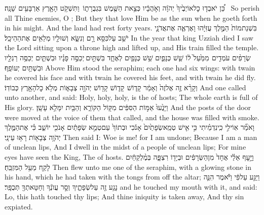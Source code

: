 {כֵּ֠ן יֹאבְד֤וּ כׇל\maqqaf אוֹיְבֶ֙יךָ֙ יְהֹוָ֔ה וְאֹ֣הֲבָ֔יו כְּצֵ֥את הַשֶּׁ֖מֶשׁ בִּגְבֻרָת֑וֹ \setuma  וַתִּשְׁקֹ֥ט הָאָ֖רֶץ אַרְבָּעִ֥ים שָׁנָֽה׃ \petucha }
{So perish all Thine enemies, O \lord; But they that love Him be as the sun when he goeth forth in his might. And the land had rest forty years.}
\newperek
{}
\label{haft_17}
\setcounter{chap}{6}
\setcounter{verse}{1}
{בִּשְׁנַת\maqqaf מוֹת֙ הַמֶּ֣לֶךְ עֻזִּיָּ֔הוּ וָאֶרְאֶ֧ה אֶת\maqqaf אֲדֹנָ֛י יֹשֵׁ֥ב עַל\maqqaf כִּסֵּ֖א רָ֣ם וְנִשָּׂ֑א וְשׁוּלָ֖יו מְלֵאִ֥ים אֶת\maqqaf הַהֵיכָֽל׃}
{In the year that king Uzziah died I saw the Lord sitting upon a throne high and lifted up, and His train filled the temple.}
{שְׂרָפִ֨ים עֹמְדִ֤ים \pasek  מִמַּ֙עַל֙ ל֔וֹ שֵׁ֧שׁ כְּנָפַ֛יִם שֵׁ֥שׁ כְּנָפַ֖יִם לְאֶחָ֑ד בִּשְׁתַּ֣יִם \legarmeh  יְכַסֶּ֣ה פָנָ֗יו וּבִשְׁתַּ֛יִם יְכַסֶּ֥ה רַגְלָ֖יו וּבִשְׁתַּ֥יִם יְעוֹפֵֽף׃}
{Above Him stood the seraphim; each one had six wings: with twain he covered his face and with twain he covered his feet, and with twain he did fly.}
{וְקָרָ֨א זֶ֤ה אֶל\maqqaf זֶה֙ וְאָמַ֔ר קָד֧וֹשׁ \pasek  קָד֛וֹשׁ קָד֖וֹשׁ יְהֹוָ֣ה צְבָא֑וֹת מְלֹ֥א כׇל\maqqaf הָאָ֖רֶץ כְּבוֹדֽוֹ׃}
{And one called unto another, and said: Holy, holy, holy, is the \lord\space of hosts; The whole earth is full of His glory.}
{וַיָּנֻ֙עוּ֙ אַמּ֣וֹת הַסִּפִּ֔ים מִקּ֖וֹל הַקּוֹרֵ֑א וְהַבַּ֖יִת יִמָּלֵ֥א עָשָֽׁן׃}
{And the posts of the door were moved at the voice of them that called, and the house was filled with smoke.}
{וָאֹמַ֞ר אֽוֹי\maqqaf לִ֣י כִֽי\maqqaf נִדְמֵ֗יתִי כִּ֣י אִ֤ישׁ טְמֵֽא\maqqaf שְׂפָתַ֙יִם֙ אָנֹ֔כִי וּבְתוֹךְ֙ עַם\maqqaf טְמֵ֣א שְׂפָתַ֔יִם אָנֹכִ֖י יוֹשֵׁ֑ב כִּ֗י אֶת\maqqaf הַמֶּ֛לֶךְ יְהֹוָ֥ה צְבָא֖וֹת רָא֥וּ עֵינָֽי׃}
{Then said I: Woe is me! for I am undone; Because I am a man of unclean lips, And I dwell in the midst of a people of unclean lips; For mine eyes have seen the King, The \lord\space of hosts.}
{וַיָּ֣עׇף אֵלַ֗י אֶחָד֙ מִן\maqqaf הַשְּׂרָפִ֔ים וּבְיָד֖וֹ רִצְפָּ֑ה בְּמֶ֨לְקַחַ֔יִם לָקַ֖ח מֵעַ֥ל הַמִּזְבֵּֽחַ׃}
{Then flew unto me one of the seraphim, with a glowing stone in his hand, which he had taken with the tongs from off the altar;}
{וַיַּגַּ֣ע עַל\maqqaf פִּ֔י וַיֹּ֕אמֶר הִנֵּ֛ה נָגַ֥ע זֶ֖ה עַל\maqqaf שְׂפָתֶ֑יךָ וְסָ֣ר עֲוֺנֶ֔ךָ וְחַטָּאתְךָ֖ תְּכֻפָּֽר׃}
{and he touched my mouth with it, and said: Lo, this hath touched thy lips; And thine iniquity is taken away, And thy sin expiated.}

